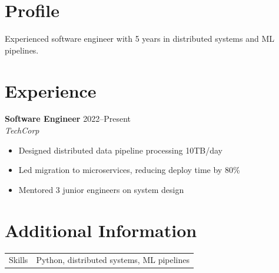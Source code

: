 \documentclass{article}
\begin{document}
\section*{Profile}
Experienced software engineer with 5 years in distributed systems and ML pipelines.

\section*{Experience}
\textbf{Software Engineer} \hfill 2022--Present \\
\textit{TechCorp}
\begin{itemize}
    \item Designed distributed data pipeline processing 10TB/day
    \item Led migration to microservices, reducing deploy time by 80\%
    \item Mentored 3 junior engineers on system design
\end{itemize}

\section*{Additional Information}
\begin{tabular}{ l l }
Skills & Python, distributed systems, ML pipelines \\
\end{tabular}
\end{document}
